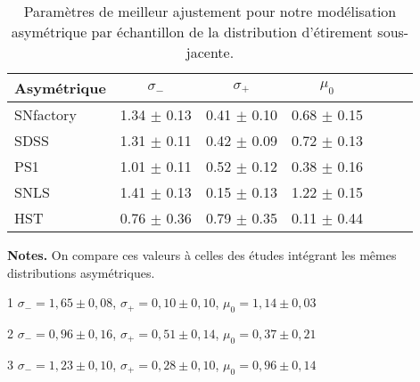 \documentclass[../main/main.tex]{subfiles}
\begin{document}
\begin{table}
    \centering
    \begin{threeparttable}
        \caption[Paramètres de meilleur ajustement pour notre modélisation
        asymétrique par échantillon de la distribution d'étirement
        sous-jacente.]{Paramètres de meilleur ajustement pour notre modélisation
        asymétrique par échantillon de la distribution d'étirement sous-jacente.}
        \label{tab:bbc}
        \begin{tabular}{lcccccc}
        \toprule
        Asymétrique   & $\sigma_{-}$    & $\sigma_{+}$    & $\mu_0$ \\
        \midrule
        SNfactory     & 1.34 $\pm$ 0.13 & 0.41 $\pm$ 0.10 & 0.68 $\pm$ 0.15 \\
        SDSS\tnote{1} & 1.31 $\pm$ 0.11 & 0.42 $\pm$ 0.09 & 0.72 $\pm$ 0.13 \\
        PS1\tnote{2}  & 1.01 $\pm$ 0.11 & 0.52 $\pm$ 0.12 & 0.38 $\pm$ 0.16 \\
        SNLS\tnote{3} & 1.41 $\pm$ 0.13 & 0.15 $\pm$ 0.13 & 1.22 $\pm$ 0.15 \\
        HST           & 0.76 $\pm$ 0.36 & 0.79 $\pm$ 0.35 & 0.11 $\pm$ 0.44 \\
        \bottomrule
        \end{tabular}
        \begin{tablenotes}[flushleft]
            \item \textbf{\hspace{-3.2pt}Notes.} On compare ces valeurs à celles
                des études intégrant les mêmes distributions asymétriques.
            \item [1] $\sigma_{-} = 1,65 \pm 0,08$, $\sigma_{+} = 0,10 \pm
                0,10$, $\mu_0 = 1,14 \pm 0,03$ \citep[Tableau~1,][]{scolnic2016}
            \item [2] $\sigma_{-} = 0,96 \pm 0,16$, $\sigma_{+} = 0,51 \pm
                0,14$, $\mu_0 = 0,37 \pm 0,21$ \citep[Tableau~3,][]{scolnic2018}
            \item [3] $\sigma_{-} = 1,23 \pm 0,10$, $\sigma_{+} = 0,28 \pm
                0,10$, $\mu_0 = 0,96 \pm 0,14$ \citep[Tableau~1,][]{scolnic2016}
        \end{tablenotes}
    \end{threeparttable}
\end{table}
\end{document}

